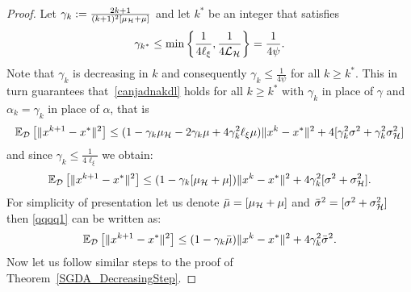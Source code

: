 \documentclass{article}
\begin{document}
\begin{proof}
Let  $\gamma_k := \frac{2k+1}{(k+1)^2 [\mu_{{\cal H}}+\mu]}$ and let $k^*$ be an integer that satisfies $$\gamma_{k^*} \leq \min\left\{\frac{1}{4\ell_{\xi}},\frac{1}{4{\cal L}_{{\cal H}}}\right\} = \frac{1}{4 \psi}.$$
Note that $\gamma_k$ is decreasing in $k$ and  consequently $\gamma_k \leq \frac{1}{4 \psi}$ for all $k \geq k^*.$ This in turn guarantees that~\eqref{canjadnakdl} holds for all $k\geq k^*$ with $\gamma_k$ in place of $\gamma$ and $\alpha_k=\gamma_k$ in place of $\alpha$, that is 
\begin{eqnarray*}
\mathbb{E}_{{\cal D}} \left[ \|x^{k+1}-x^*\|^2 \right] \leq (1-\gamma_k\mu_{{\cal H}}  -2 \gamma_k\mu + 4\gamma_k^2  \ell_{\xi}\mu )\|x^k-x^*\|^2 + 4[\gamma_k^2 \sigma^2 + \gamma_k^2  \sigma_{{\cal H}}^2]
\end{eqnarray*}
and since $\gamma_k \leq \frac{1}{4\ell_\xi}$ we obtain:
\begin{eqnarray}
\label{qqqq1}
\mathbb{E}_{{\cal D}} \left[ \|x^{k+1}-x^*\|^2 \right] \leq (1-\gamma_k [\mu_{{\cal H}} + \mu])\|x^k-x^*\|^2 + 4\gamma_k^2 [\sigma^2 + \sigma_{{\cal H}}^2].
\end{eqnarray}
For simplicity of presentation let us denote $\bar{\mu}= [\mu_{{\cal H}} + \mu]$ and $\bar{\sigma}^2=[\sigma^2 + \sigma_{{\cal H}}^2]$ then \eqref{qqqq1} can be written as:
\begin{eqnarray}
\label{qqqq2}
\mathbb{E}_{{\cal D}} \left[ \|x^{k+1}-x^*\|^2 \right] \leq (1-\gamma_k\bar{\mu})\|x^k-x^*\|^2 + 4\gamma_k^2 \bar{\sigma}^2.
\end{eqnarray}
Now let us follow similar steps to the proof of Theorem~\ref{SGDA_DecreasingStep}.


\end{proof}
\end{document}
